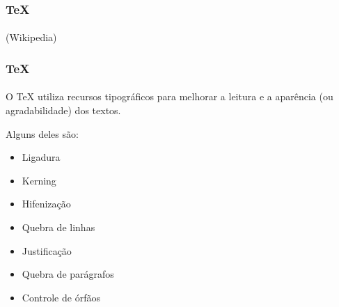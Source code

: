\begin{frame}
\frametitle{\TeX{}}
\framesubtitle{}
\begin{flushleft}
\hspace{1.1em}\footnotesize{(Wikipedia)}
\end{flushleft}
\end{frame}

\begin{frame} 
\frametitle{\TeX{}}
\framesubtitle{}

O \TeX{} utiliza recursos tipográficos para melhorar a leitura e
a aparência (ou agradabilidade) dos textos.

Alguns deles são:
\begin{itemize}
  \item Ligadura
  \item Kerning
  \item Hifenização
  \item Quebra de linhas
  \item Justificação
  \item Quebra de parágrafos
  \item Controle de órfãos 
\end{itemize}
\end{frame}

